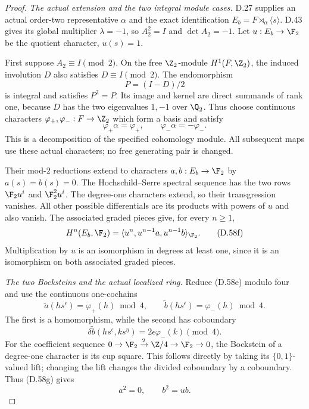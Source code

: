 \begin{proof}
\emph{The actual extension and the two integral module cases.}
D.27 supplies an actual order-two representative
$\alpha$ and the exact identification
$E_b=F\rtimes_\alpha\langle s\rangle$.
D.43 gives its global multiplier $\lambda=-1$,
so $A_2^2=I$ and $\det A_2=-1$.
Let $u:E_b\to\F_2$ be the quotient character,
$u(s)=1$.

First suppose $A_2\equiv I\pmod2$.
On the free $\Z_2$-module $H^1(F,\Z_2)$, the induced
involution $D$ also satisfies $D\equiv I\pmod2$.
The endomorphism
\[
                         P=(I-D)/2                     \tag{D.58d}
\]
is integral and satisfies $P^2=P$.
Its image and kernel are direct summands of rank one,
because $D$ has the two eigenvalues $1,-1$ over $\Q_2$.
Thus choose continuous characters
$\varphi_+,\varphi_-:F\to\Z_2$ which form a basis and
satisfy
\[
        \varphi_+\alpha=\varphi_+,\qquad
        \varphi_-\alpha=-\varphi_- .                    \tag{D.58e}
\]
This is a decomposition of the specified cohomology
module. All subsequent maps use these actual
characters; no free generating pair is changed.

Their mod-$2$ reductions extend to characters
$a,b:E_b\to\F_2$ by $a(s)=b(s)=0$.
The Hochschild--Serre spectral sequence has the two
rows $\F_2u^i$ and $\F_2^2u^i$.
The degree-one characters extend, so their
transgression vanishes.
All other possible differentials are its products
with powers of $u$ and also vanish.
The associated graded pieces give, for every $n\geq1$,
\[
 H^n(E_b,\F_2)
     =\langle u^n,u^{n-1}a,u^{n-1}b\rangle_{\F_2}.
                                                        \tag{D.58f}
\]
Multiplication by $u$ is an isomorphism in degrees
at least one, since it is an isomorphism on both
associated graded pieces.

\emph{The two Bocksteins and the actual localized ring.}
Reduce (D.58e) modulo four and use the continuous
one-cochains
\[
 \widetilde a(hs^\epsilon)=\varphi_+(h)\bmod4,\qquad
 \widetilde b(hs^\epsilon)=\varphi_-(h)\bmod4.
\]
The first is a homomorphism, while the second has
coboundary
\[
 \delta\widetilde b(hs^\epsilon,ks^\eta)
        =2\epsilon\varphi_-(k)\pmod4.                   \tag{D.58g}
\]
For the coefficient sequence
$0\to\F_2\xrightarrow{2}\Z/4\to\F_2\to0$,
the Bockstein of a degree-one character is its
cup square. This follows directly by taking its
$\{0,1\}$-valued lift; changing the lift changes
the divided coboundary by a coboundary.
Thus (D.58g) gives
\[
                         a^2=0,\qquad b^2=ub.           \tag{D.58h}
\]


\end{proof}
